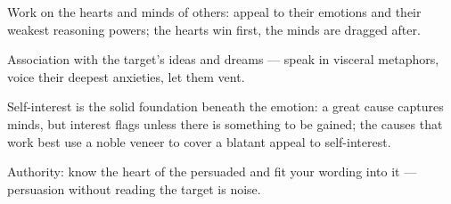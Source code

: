 

\begin{distilled}
  \item Work on the hearts and minds of others: appeal to their emotions and their weakest reasoning powers; the hearts win first, the minds are dragged after.
  \item Association with the target's ideas and dreams --- speak in visceral metaphors, voice their deepest anxieties, let them vent.
  \item Self-interest is the solid foundation beneath the emotion: a great cause captures minds, but interest flags unless there is something to be gained; the causes that work best use a noble veneer to cover a blatant appeal to self-interest.
  \item Authority: know the heart of the persuaded and fit your wording into it --- persuasion without reading the target is noise.
\end{distilled}
